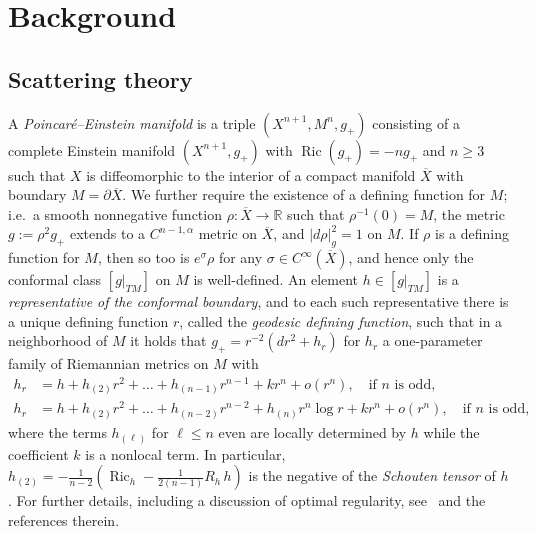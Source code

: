 \documentclass{amsart}
\theoremstyle{definition}
\theoremstyle{remark}
\numberwithin{equation}{section}
\begin{document}
\section{Background}
\label{sec:bg}

\subsection{Scattering theory}
\label{subsec:bg/scattering}

A \emph{Poincar\'e--Einstein manifold} is a triple $(X^{n+1},M^n,g_+)$ consisting of a complete Einstein manifold $(X^{n+1},g_+)$ with $\operatorname{Ric}(g_+)=-ng_+$ and $n\geq3$ such that $X$ is diffeomorphic to the interior of a compact manifold ${\overline{X}}$ with boundary $M=\partial{\overline{X}}$.  We further require the existence of a defining function for $M$; i.e.\ a smooth nonnegative function $\rho\colon{\overline{X}}\to{\mathbb{R}}$ such that $\rho^{-1}(0)=M$, the metric $g:=\rho^2g_+$ extends to a $C^{n-1,\alpha}$ metric on ${\overline{X}}$, and ${\lvert} d\rho{\rvert}_g^2=1$ on $M$.  If $\rho$ is a defining function for $M$, then so too is $e^\sigma\rho$ for any $\sigma\in C^\infty({\overline{X}})$, and hence only the conformal class $[g{\rvert}_{TM}]$ on $M$ is well-defined.  An element $h\in[g{\rvert}_{TM}]$ is a \emph{representative of the conformal boundary}, and to each such representative there is a unique defining function $r$, called the \emph{geodesic defining function}, such that in a neighborhood of $M$ it holds that $g_+=r^{-2}\left(dr^2 + h_r\right)$ for $h_r$ a one-parameter family of Riemannian metrics on $M$ with
\begin{align*}
 h_r & = h + h_{(2)}r^2 + \dotso + h_{(n-1)}r^{n-1} + kr^n + o(r^n), \quad\text{if $n$ is odd}, \\
 h_r & = h + h_{(2)}r^2 + \dotso + h_{(n-2)}r^{n-2} + h_{(n)}r^n\log r + kr^n + o(r^n), \quad\text{if $n$ is odd},
\end{align*}
where the terms $h_{(\ell)}$ for $\ell\leq n$ even are locally determined by $h$ while the coefficient $k$ is a nonlocal term.  In particular, $h_{(2)}=-\frac{1}{n-2}\left(\operatorname{Ric}_h-\frac{1}{2(n-1)}R_h\,h\right)$ is the negative of the \emph{Schouten tensor} of $h$.  For further details, including a discussion of optimal regularity, see~\cite{ChruscielDelayLeeSkinner2005} and the references therein.
\end{document}
